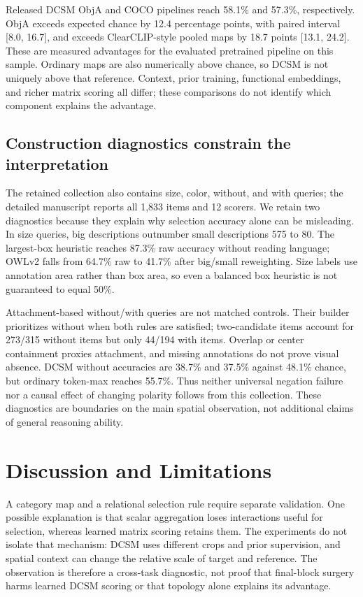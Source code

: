 \documentclass[10pt,twocolumn,letterpaper]{article}
\begin{document}
Released DCSM ObjA and COCO pipelines reach 58.1\% and 57.3\%,
respectively. ObjA exceeds expected chance by 12.4 percentage points,
with paired interval {[}8.0, 16.7{]}, and exceeds ClearCLIP-style pooled
maps by 18.7 points {[}13.1, 24.2{]}. These are measured advantages for
the evaluated pretrained pipeline on this sample. Ordinary maps are also
numerically above chance, so DCSM is not uniquely above that reference.
Context, prior training, functional embeddings, and richer matrix
scoring all differ; these comparisons do not identify which component
explains the advantage.

\subsection{Construction diagnostics constrain the
interpretation}\label{construction-diagnostics-constrain-the-interpretation}

The retained collection also contains size, color, without, and with
queries; the detailed manuscript reports all 1,833 items and 12 scorers.
We retain two diagnostics because they explain why selection accuracy
alone can be misleading. In size queries, big descriptions outnumber
small descriptions 575 to 80. The largest-box heuristic reaches 87.3\%
raw accuracy without reading language; OWLv2 falls from 64.7\% raw to
41.7\% after big/small reweighting. Size labels use annotation area
rather than box area, so even a balanced box heuristic is not guaranteed
to equal 50\%.

Attachment-based without/with queries are not matched controls. Their
builder prioritizes without when both rules are satisfied; two-candidate
items account for 273/315 without items but only 44/194 with items.
Overlap or center containment proxies attachment, and missing
annotations do not prove visual absence. DCSM without accuracies are
38.7\% and 37.5\% against 48.1\% chance, but ordinary token-max reaches
55.7\%. Thus neither universal negation failure nor a causal effect of
changing polarity follows from this collection. These diagnostics are
boundaries on the main spatial observation, not additional claims of
general reasoning ability.

\balance
\section{Discussion and Limitations}\label{discussion-and-limitations}

A category map and a relational selection rule require separate
validation. One possible explanation is that scalar aggregation loses
interactions useful for selection, whereas learned matrix scoring
retains them. The experiments do not isolate that mechanism: DCSM uses
different crops and prior supervision, and spatial context can change
the relative scale of target and reference. The observation is therefore
a cross-task diagnostic, not proof that final-block surgery harms
learned DCSM scoring or that topology alone explains its advantage.
\end{document}
